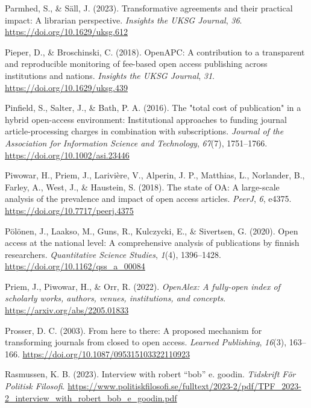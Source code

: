 \documentclass[a4paper,man,floatsintext,longtable,noextraspace,12pt]{apa6}
\newenvironment{CSLReferences}%
  {}%
  {\par}
\begin{document}
\begin{CSLReferences}{1}{0}
\leavevmode{}%
Parmhed, S., \& Säll, J. (2023). Transformative agreements and their
practical impact: A librarian perspective. \emph{Insights the UKSG
Journal}, \emph{36}. \url{https://doi.org/10.1629/uksg.612}

\leavevmode{}%
Pieper, D., \& Broschinski, C. (2018). {OpenAPC}: A contribution to a
transparent and reproducible monitoring of fee-based open access
publishing across institutions and nations. \emph{Insights the {UKSG}
Journal}, \emph{31}. \url{https://doi.org/10.1629/uksg.439}

\leavevmode{}%
Pinfield, S., Salter, J., \& Bath, P. A. (2016). The "total cost of
publication" in a hybrid open-access environment: Institutional
approaches to funding journal article-processing charges in combination
with subscriptions. \emph{Journal of the Association for Information
Science and Technology}, \emph{67}(7), 1751--1766.
\url{https://doi.org/10.1002/asi.23446}

\leavevmode{}%
Piwowar, H., Priem, J., Larivière, V., Alperin, J. P., Matthias, L.,
Norlander, B., Farley, A., West, J., \& Haustein, S. (2018). The state
of {OA}: A large-scale analysis of the prevalence and impact of open
access articles. \emph{{PeerJ}}, \emph{6}, e4375.
\url{https://doi.org/10.7717/peerj.4375}

\leavevmode{}%
Pölönen, J., Laakso, M., Guns, R., Kulczycki, E., \& Sivertsen, G.
(2020). Open access at the national level: A comprehensive analysis of
publications by finnish researchers. \emph{Quantitative Science
Studies}, \emph{1}(4), 1396--1428.
\url{https://doi.org/10.1162/qss_a_00084}

\leavevmode{}%
Priem, J., Piwowar, H., \& Orr, R. (2022). \emph{OpenAlex: A fully-open
index of scholarly works, authors, venues, institutions, and concepts}.
\url{https://arxiv.org/abs/2205.01833}

\leavevmode{}%
Prosser, D. C. (2003). From here to there: A proposed mechanism for
transforming journals from closed to open access. \emph{Learned
Publishing}, \emph{16}(3), 163--166.
\url{https://doi.org/10.1087/095315103322110923}

\leavevmode{}%
Rasmussen, K. B. (2023). Interview with robert {``bob''} e. goodin.
\emph{Tidskrift För Politisk Filosofi}.
\url{https://www.politiskfilosofi.se/fulltext/2023-2/pdf/TPF_2023-2_interview_with_robert_bob_e_goodin.pdf}


\end{CSLReferences}
\end{document}
